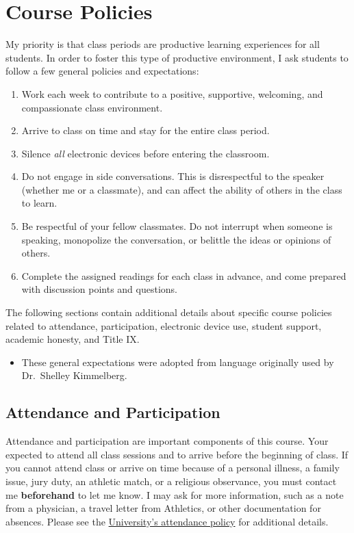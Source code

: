 \documentclass[]{book}
\providecommand{\tightlist}{%
  \setlength{\itemsep}{0pt}\setlength{\parskip}{0pt}}
\newenvironment{rmdblock}[1]
  {\begin{shaded*}
  \begin{itemize}
  \renewcommand{\labelitemi}{
    \raisebox{-.7\height}[0pt][0pt]{
      {\setkeys{Gin}{width=3em,keepaspectratio}\texttt{[image: images/\#1]}}
    }
  }
  \item
  }
  {
  \end{itemize}
  \end{shaded*}
  }
\newenvironment{rmdnote}
  {\begin{rmdblock}{note}}
  {\end{rmdblock}}
\begin{document}
\hypertarget{course-policies}{%
\chapter{Course Policies}\label{course-policies}}

My priority is that class periods are productive learning experiences for all students. In order to foster this type of productive environment, I ask students to follow a few general policies and expectations:

\begin{enumerate}
\def\labelenumi{\arabic{enumi}.}
\tightlist
\item
  Work each week to contribute to a positive, supportive, welcoming, and compassionate class environment.
\item
  Arrive to class on time and stay for the entire class period.
\item
  Silence \emph{all} electronic devices before entering the classroom.
\item
  Do not engage in side conversations. This is disrespectful to the speaker (whether me or a classmate), and can affect the ability of others in the class to learn.
\item
  Be respectful of your fellow classmates. Do not interrupt when someone is speaking, monopolize the conversation, or belittle the ideas or opinions of others.
\item
  Complete the assigned readings for each class in advance, and come prepared with discussion points and questions.
\end{enumerate}

The following sections contain additional details about specific course policies related to attendance, participation, electronic device use, student support, academic honesty, and Title IX.

\begin{rmdnote}
These general expectations were adopted from language originally used by
Dr.~Shelley Kimmelberg.
\end{rmdnote}

\hypertarget{attendance-and-participation}{%
\section{Attendance and Participation}\label{attendance-and-participation}}

Attendance and participation are important components of this course. Your expected to attend all class sessions and to arrive before the beginning of class. If you cannot attend class or arrive on time because of a personal illness, a family issue, jury duty, an athletic match, or a religious observance, you must contact me \textbf{beforehand} to let me know. I may ask for more information, such as a note from a physician, a travel letter from Athletics, or other documentation for absences. Please see the \href{https://catalog.slu.edu/academic-policies/academic-policies-procedures/attendance/}{University's attendance policy} for additional details.
\end{document}
